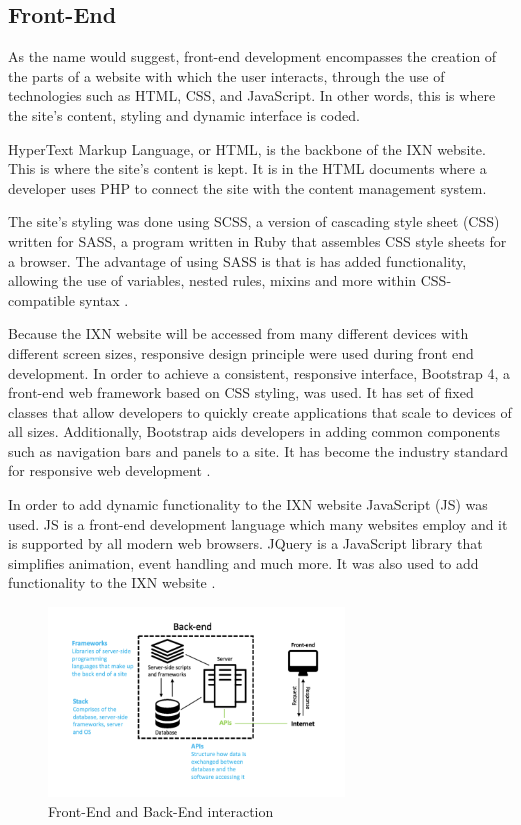 \documentclass[fontsize=10pt]{extarticle}
\numberwithin{figure}{section} %
\begin{document}
\hypertarget{front-end}{%
\subsection{Front-End}\label{front-end}}

As the name would suggest, front-end development encompasses the
creation of the parts of a website with which the user interacts,
through the use of technologies such as HTML, CSS, and JavaScript. In
other words, this is where the site's content, styling and dynamic
interface is coded.

HyperText Markup Language, or HTML, is the backbone of the IXN website.
This is where the site's content is kept. It is in the HTML documents
where a developer uses PHP to connect the site with the content
management system.

The site's styling was done using SCSS, a version of cascading style
sheet (CSS) written for SASS, a program written in Ruby that assembles
CSS style sheets for a browser. The advantage of using SASS is that is
has added functionality, allowing the use of variables, nested rules,
mixins and more within CSS-compatible syntax \cite{p14} .

Because the IXN website will be accessed from many different devices
with different screen sizes, responsive design principle were used
during front end development. In order to achieve a consistent,
responsive interface, Bootstrap 4, a front-end web framework based on
CSS styling, was used. It has set of fixed classes that allow developers
to quickly create applications that scale to devices of all sizes.
Additionally, Bootstrap aids developers in adding common components such
as navigation bars and panels to a site. It has become the industry
standard for responsive web development \cite{p15} .

In order to add dynamic functionality to the IXN website JavaScript (JS)
was used. JS is a front-end development language which many websites
employ and it is supported by all modern web browsers. JQuery is a
JavaScript library that simplifies animation, event handling and much
more. It was also used to add functionality to the IXN website
\cite{p16}.

\begin{figure}[H]
      \centering
      \includegraphics[trim = 0 0 0 0, clip, width=0.7\textwidth]{ph18.png}
      \caption{Front-End and Back-End interaction}
 \end{figure}
\end{document}
